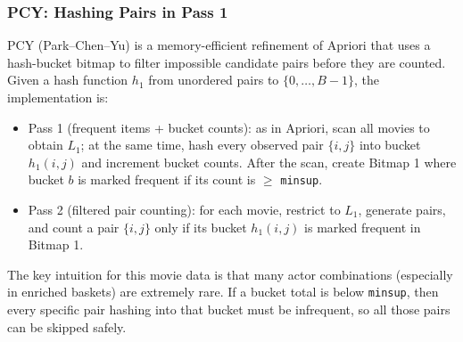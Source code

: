 \documentclass{article}  %
\begin{document}
\subsubsection{PCY: Hashing Pairs in Pass 1}

PCY (Park--Chen--Yu) is a memory-efficient refinement of Apriori that uses a hash-bucket bitmap to filter impossible candidate pairs before they are counted. Given a hash function \(h_1\) from unordered pairs to \(\{0, \dots, B-1\}\), the implementation is:
\begin{itemize}
    \item Pass 1 (frequent items + bucket counts): as in Apriori, scan all movies to obtain \(L_1\); at the same time, hash every observed pair \(\{i,j\}\) into bucket \(h_1(i,j)\) and increment bucket counts. After the scan, create Bitmap 1 where bucket \(b\) is marked frequent if its count is \(\ge\) \verb|minsup|.
    \item Pass 2 (filtered pair counting): for each movie, restrict to \(L_1\), generate pairs, and count a pair \(\{i,j\}\) only if its bucket \(h_1(i,j)\) is marked frequent in Bitmap 1.
\end{itemize}

The key intuition for this movie data is that many actor combinations (especially in enriched baskets) are extremely rare. If a bucket total is below \verb|minsup|, then every specific pair hashing into that bucket must be infrequent, so all those pairs can be skipped safely.
\end{document}
